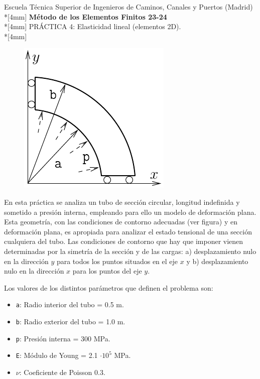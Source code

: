 \documentclass[a4paper,12pt]{article}
\begin{document}
\def\bm#1{{\mbox{\boldmath $#1$}}}
\def\eqdef{\buildrel \rm def \over =}
\def\signo{\mathop{\rm signo}\nolimits}

\mbox{}\vspace*{-20mm}

{\centering
{\small\sc Escuela Técnica Superior de Ingenieros de Caminos, Canales y Puertos (Madrid)}\\*[4mm]
{\Large\bf Método de los Elementos Finitos 23-24}\\*[4mm]
PRÁCTICA 4: Elasticidad lineal (elementos 2D). \\*[4mm]}


\begin{figure}
\includegraphics{cilipst}
\end{figure}

En esta práctica se analiza un tubo de sección circular, longitud indefinida y sometido a presión interna, empleando para ello un modelo de deformación plana.
Esta geometría, con las condiciones de contorno adecuadas (ver figura) y en deformación plana, es apropiada para analizar el estado tensional de una sección cualquiera del tubo.
Las condiciones de contorno que hay que imponer vienen determinadas por la simetría de la sección y de las cargas: a) desplazamiento nulo en la dirección $y$ para todos los puntos situados en el eje $x$ y b) desplazamiento nulo en la dirección $x$ para los puntos del eje $y$.

Los valores de los distintos parámetros que definen el problema son:

\begin{itemize}
\item  \texttt {a}: Radio interior del tubo = 0.5 m.
\item \texttt {b}: Radio exterior del tubo = 1.0 m.
\item \texttt {p}: Presión interna = 300 MPa.
\item \texttt {E}: Módulo de Young = 2.1 $\cdot10^5$ MPa.
\item \texttt {$\nu$}: Coeficiente de Poisson 0.3.
\end{itemize}
\end{document}

